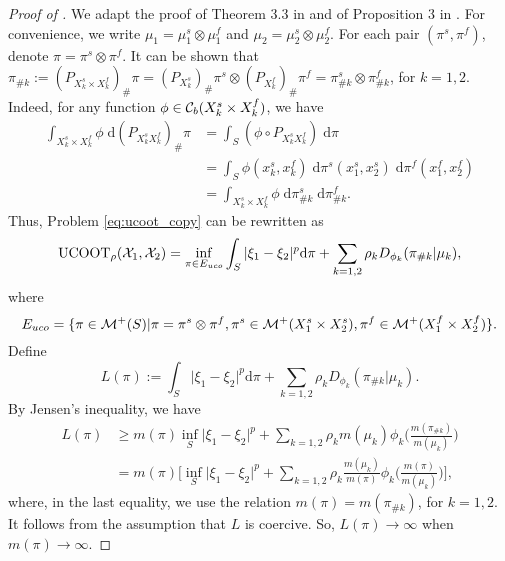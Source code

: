 \begin{proof}[Proof of ]
  We adapt the proof of Theorem 3.3 in \citep{Liero18} and of Proposition 3 in \citep{Sejourne20}.
  For convenience, we write $\mu_1 = \mu_1^s \otimes \mu_1^f$ and
  $\mu_2 = \mu_2^s \otimes \mu_2^f$. For each pair $(\pi^s, \pi^f)$, denote
  $\pi = \pi^s \otimes \pi^f$.
  It can be shown that
  $\pi_{\# k} := (P_{X_k^s \times X_k^f})_{\#} \pi
  = (P_{X_k^s})_{\#} \pi^s \otimes (P_{X_k^f})_{\#} \pi^f =
  \pi^s_{\# k} \otimes \pi^f_{\# k}$, for $k=1,2$. Indeed, for any function
  $\phi \in \mathcal C_b(X_k^s \times X_k^f)$, we have
    \begin{equation}
      \begin{split}
        \int_{X_k^s \times X_k^f} \phi \;
        \mathrm d (P_{X_k^s X_k^f})_{\#} \pi
        &= \int_{S} (\phi \circ P_{X_k^s X_k^f}) \; \mathrm d\pi \\
        &= \int_{S} \phi(x_k^s, x_k^f)
        \; \mathrm d \pi^s(x_1^s, x_2^s) \; \mathrm d \pi^f(x_1^f, x_2^f) \\
        &= \int_{X_k^s \times X_k^f} \phi \; \mathrm d \pi^s_{\# k} \;
        \mathrm d \pi^f_{\# k}.
      \end{split}
    \end{equation}
  Thus, Problem \eqref{eq:ucoot_copy} can be rewritten as
  \begin{equation}
    \text{UCOOT}_{\rho}(\mathcal X_1, \mathcal X_2) =
    \inf_{\pi \in E_{uco}} \int_{S} \vert \xi_1 - \xi_2 \vert^p
    \mathrm d\pi + \sum_{k=1,2} \rho_k D_{\phi_k}(\pi_{\# k} \vert \mu_k),
  \end{equation}
  where
  \begin{equation}
    E_{uco} = \{ \pi \in \mathcal M^+(S) \vert \pi = \pi^s \otimes \pi^f,
    \pi^s \in \mathcal M^+(X_1^s \times X_2^s),
    \pi^f \in \mathcal M^+(X_1^f \times X_2^f) \}.
  \end{equation}
  Define
  \begin{equation}
    L(\pi):= \int_{S} \vert \xi_1 - \xi_2 \vert^p \mathrm d \pi +
    \sum_{k=1,2} \rho_k D_{\phi_k}(\pi_{\# k} \vert \mu_k).
  \end{equation}
  By Jensen's inequality, we have
  \begin{equation}
    \begin{split}
      L(\pi) &\geq m(\pi) \inf_{S} \vert \xi_1 - \xi_2 \vert^p +
      \sum_{k=1,2} \rho_k m(\mu_k) \phi_k \Big( \frac{m(\pi_{\# k})}{m(\mu_k)} \Big) \\
      &= m(\pi) \bigg[ \inf_{S} \vert \xi_1 - \xi_2 \vert^p +
      \sum_{k=1,2} \rho_k \frac{m(\mu_k)}{m(\pi)} \phi_k
      \Big( \frac{m(\pi)}{m(\mu_k)} \Big) \bigg],
    \end{split}
  \end{equation}
  where, in the last equality, we use the relation $m(\pi) = m(\pi_{\# k})$, for $k=1,2$.
  It follows from the assumption that $L$ is coercive. So, $L(\pi) \to \infty$
  when $m(\pi) \to \infty$.


\end{proof}
